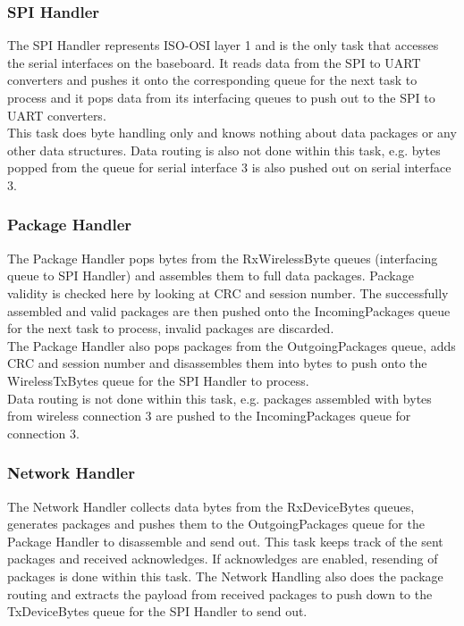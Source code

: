 \subsubsection{SPI Handler}
The SPI Handler represents ISO-OSI layer 1 and is the only task that accesses the serial interfaces on the baseboard. It reads data from the SPI to UART converters and pushes it onto the corresponding queue for the next task to process and it pops data from its interfacing queues to push out to the SPI to UART converters.\\
This task does byte handling only and knows nothing about data packages or any other data structures. Data routing is also not done within this task, e.g. bytes popped from the queue for serial interface 3 is also pushed out on serial interface 3.
%
\subsubsection{Package Handler}
The Package Handler pops bytes from the RxWirelessByte queues (interfacing queue to SPI Handler) and assembles them to full data packages. Package validity is checked here by looking at CRC and session number. The successfully assembled and valid packages are then pushed onto the IncomingPackages queue for the next task to process, invalid packages are discarded.\\
The Package Handler also pops packages from the OutgoingPackages queue, adds CRC and session number and disassembles them into bytes to push onto the WirelessTxBytes queue for the SPI Handler to process.\\
Data routing is not done within this task, e.g. packages assembled with bytes from wireless connection 3 are pushed to the IncomingPackages queue for connection 3.
%
\subsubsection{Network Handler}
The Network Handler collects data bytes from the RxDeviceBytes queues, generates packages and pushes them to the OutgoingPackages queue for the Package Handler to disassemble and send out. This task keeps track of the sent packages and received acknowledges. If acknowledges are enabled, resending of packages is done within this task. The Network Handling also does the package routing and extracts the payload from received packages to push down to the TxDeviceBytes queue for the SPI Handler to send out.
%

